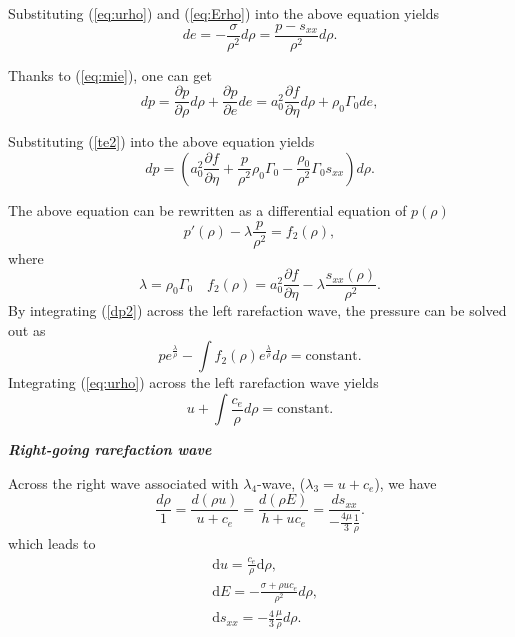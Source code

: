 \documentclass[review]{elsarticle}
\numberwithin{equation}{section}
\numberwithin{table}{section}
\begin{document}
Substituting (\ref{eq:urho}) and (\ref{eq:Erho}) into the above equation yields
\begin{equation}\label{te2}
  d e = -\frac{\sigma}{\rho^2} d\rho=\frac{p-s_{xx}}{\rho^2} d\rho.
\end{equation}

Thanks to (\ref{eq:mie}), one can get
\begin{equation}\label{dp1}
  dp =  \frac{\partial p}{\partial \rho}d \rho +  \frac{\partial p}{\partial e}d e= a_0^2 \frac{\partial f}{\partial \eta} d \rho + \rho_0 \Gamma_0 de,
\end{equation}

Substituting (\ref{te2}) into the above equation yields
\begin{equation}
  dp =  \left( a_0^2 \frac{\partial f}{\partial \eta} + \frac{p}{\rho^2}\rho_0\Gamma_0 -\frac{\rho_0}{\rho^2}\Gamma_0 s_{xx}\right) d\rho.
\end{equation}

The above equation  can  be rewritten as a differential equation of $p(\rho)$
\begin{equation} \label{dp2}
  p'(\rho) - \lambda \frac{p}{\rho^2} = f_2(\rho),
\end{equation}
where
\begin{equation}
  \lambda = \rho_0 \Gamma_0 \quad f_2(\rho) = a_0^2\frac{\partial f}{\partial \eta}- \lambda\frac{s_{xx}(\rho)}{\rho^2}.
\end{equation}
By integrating (\ref{dp2}) across the left rarefaction wave, the pressure can be solved out as
\begin{equation}\label{eq:prhoEL}
  p e^{\frac{\lambda}{\rho}} - \int f_2(\rho) e^{\frac{\lambda}{\rho}}d\rho = \text{constant}.
\end{equation}
Integrating  (\ref{eq:urho}) across the left rarefaction wave yields
\begin{equation}\label{eq:urhoEL}
  u+\int\frac{c_e}{\rho} d\rho = \text{constant}.
\end{equation}

\emph{\textbf{Right-going rarefaction wave} }

Across the right wave associated with $\lambda_4$-wave, ($\lambda_3=u+c_e$), we have
\begin{equation}
  \frac{d\rho}{1} = \frac{d(\rho u)}{u+c_e} = \frac{d(\rho E)}{h+uc_e} = \frac{ds_{xx}}{-\frac{4\mu}{3}\frac{1}{\rho}}.
\end{equation}
which leads to
\begin{align}
  \label{eq:urhoR}
  & \text{d} u =\frac{c_e}{\rho}\text{d}\rho,\\
 \label{eq:ErhoR}
  & \text{d} E = -\frac{\sigma+\rho u c_e}{\rho^2} d\rho,\\
\label{eq:sxxrhoR}
& \text{d} s_{xx} = -\frac{4}{3}\frac{\mu}{\rho} d\rho.
\end{align}
\end{document}
